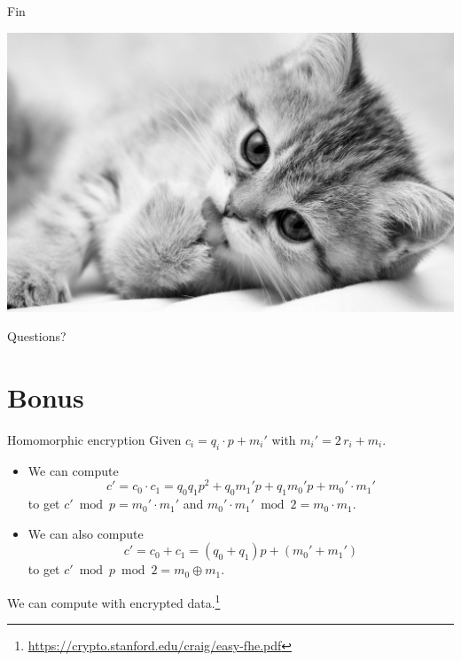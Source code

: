 \documentclass[presentation,smaller]{beamer}
\begin{document}
\begin{frame}[standout,label={sec:org3fe42e1}]{Fin}
\begin{center}
\begin{center}
\includegraphics[width=.9\linewidth]{./kitten-01.jpg}
\end{center}

\alert{\Large Questions?}
\end{center}
\end{frame}

\section{Bonus}
\label{sec:org1e9c060}

\begin{frame}[label={sec:orgbea4b6c}]{Homomorphic encryption}
Given \(c_i = q_i ⋅ p + m_i'\) with \(m_i' = 2\,r_i + m_i\).
\begin{itemize}
\item We can compute \[c' = c_0 ⋅ c_1 = q_0 q_1 p^2 + q_0 m_1' p  + q_1 m_0' p + m_0' ⋅ m_1'\] to get \(c' \bmod p =  m_0' ⋅ m_1'\) and \(m_0' ⋅ m_1' \bmod 2 = m_0 ⋅ m_1\).
\item We can also compute \[c' = c_0 + c_1 = (q_0 + q_1) p + (m_0' + m_1')\] to get \(c' \bmod p \bmod 2 = m_0 \oplus m_1\).
\end{itemize}

We can compute with encrypted data.\footnote{\url{https://crypto.stanford.edu/craig/easy-fhe.pdf}}
\end{frame}
\end{document}
